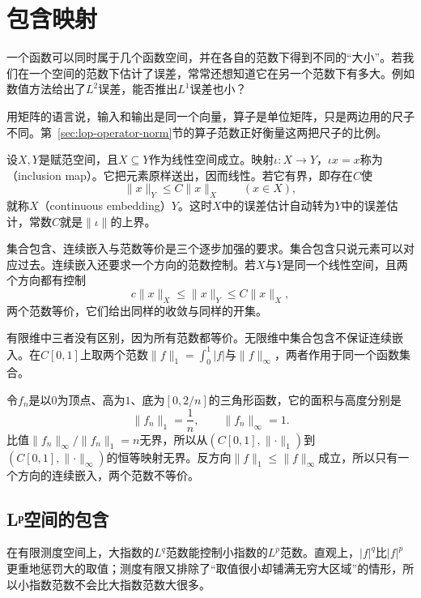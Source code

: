\section{包含映射}
\label{sec:lop-inclusions}

一个函数可以同时属于几个函数空间，并在各自的范数下得到不同的“大小”。若我们在一个空间的范数下估计了误差，常常还想知道它在另一个范数下有多大。例如数值方法给出了$L^2$误差，能否推出$L^1$误差也小？

用矩阵的语言说，输入和输出是同一个向量，算子是单位矩阵，只是两边用的尺子不同。第~\ref{sec:lop-operator-norm}节的算子范数正好衡量这两把尺子的比例。

设$X,Y$是赋范空间，且$X\subseteq Y$作为线性空间成立。映射$\iota:X\to Y$，$\iota x=x$称为（inclusion map）。它把元素原样送出，因而线性。若它有界，即存在$C$使
\begin{equation}
 \lVert x\rVert_Y\leq C\lVert x\rVert_X\qquad(x\in X),
 \label{eq:lop-embedding}
\end{equation}
就称$X$（continuous embedding）$Y$。这时$X$中的误差估计自动转为$Y$中的误差估计，常数$C$就是$\lVert\iota\rVert$的上界。

集合包含、连续嵌入与范数等价是三个逐步加强的要求。集合包含只说元素可以对应过去。连续嵌入还要求一个方向的范数控制。若$X$与$Y$是同一个线性空间，且两个方向都有控制
\[
 c\lVert x\rVert_X\leq\lVert x\rVert_Y\leq C\lVert x\rVert_X,
\]
两个范数等价，它们给出同样的收敛与同样的开集。

有限维中三者没有区别，因为所有范数都等价。无限维中集合包含不保证连续嵌入。在$C[0,1]$上取两个范数$\lVert f\rVert_1=\int_0^1\lvert f\rvert$与$\lVert f\rVert_\infty$，两者作用于同一个函数集合。

令$f_n$是以$0$为顶点、高为$1$、底为$[0,2/n]$的三角形函数，它的面积与高度分别是
\[
 \lVert f_n\rVert_1=\frac1n,\qquad\lVert f_n\rVert_\infty=1.
\]
比值$\lVert f_n\rVert_\infty/\lVert f_n\rVert_1=n$无界，所以从$(C[0,1],\lVert\cdot\rVert_1)$到$(C[0,1],\lVert\cdot\rVert_\infty)$的恒等映射无界。反方向$\lVert f\rVert_1\leq\lVert f\rVert_\infty$成立，所以只有一个方向的连续嵌入，两个范数不等价。

\subsection{Lᵖ空间的包含}
\label{sec:lop-lp-inclusion}

在有限测度空间上，大指数的$L^q$范数能控制小指数的$L^p$范数。直观上，$\lvert f\rvert^q$比$\lvert f\rvert^p$更重地惩罚大的取值；测度有限又排除了“取值很小却铺满无穷大区域”的情形，所以小指数范数不会比大指数范数大很多。

